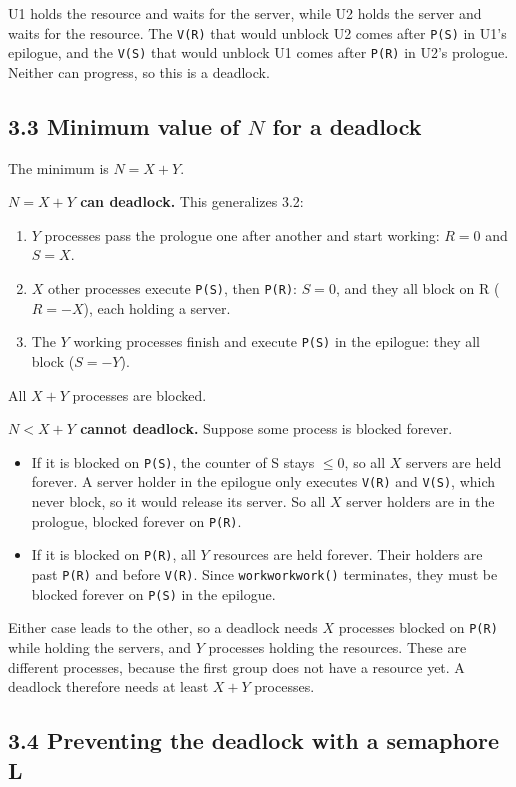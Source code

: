 \documentclass[letterpaper, 11pt]{article}
\newcommand{\1}{\mathds{1}}	%
\theoremstyle{definition}
\begin{document}
U1 holds the resource and waits for the server, while U2 holds the server and waits for the resource. The \texttt{V(R)} that would unblock U2 comes after \texttt{P(S)} in U1's epilogue, and the \texttt{V(S)} that would unblock U1 comes after \texttt{P(R)} in U2's prologue. Neither can progress, so this is a deadlock.

\subsection*{3.3 Minimum value of $N$ for a deadlock}

The minimum is $N = X + Y$.

\textbf{$N = X + Y$ can deadlock.} This generalizes 3.2:
\begin{enumerate}
  \item $Y$ processes pass the prologue one after another and start working: $R = 0$ and $S = X$.
  \item $X$ other processes execute \texttt{P(S)}, then \texttt{P(R)}: $S = 0$, and they all block on R ($R = -X$), each holding a server.
  \item The $Y$ working processes finish and execute \texttt{P(S)} in the epilogue: they all block ($S = -Y$).
\end{enumerate}
All $X + Y$ processes are blocked.

\textbf{$N < X + Y$ cannot deadlock.} Suppose some process is blocked forever.
\begin{itemize}
  \item If it is blocked on \texttt{P(S)}, the counter of S stays $\le 0$, so all $X$ servers are held forever. A server holder in the epilogue only executes \texttt{V(R)} and \texttt{V(S)}, which never block, so it would release its server. So all $X$ server holders are in the prologue, blocked forever on \texttt{P(R)}.
  \item If it is blocked on \texttt{P(R)}, all $Y$ resources are held forever. Their holders are past \texttt{P(R)} and before \texttt{V(R)}. Since \texttt{workworkwork()} terminates, they must be blocked forever on \texttt{P(S)} in the epilogue.
\end{itemize}
Either case leads to the other, so a deadlock needs $X$ processes blocked on \texttt{P(R)} while holding the servers, and $Y$ processes holding the resources. These are different processes, because the first group does not have a resource yet. A deadlock therefore needs at least $X + Y$ processes.

\subsection*{3.4 Preventing the deadlock with a semaphore L}
\end{document}
